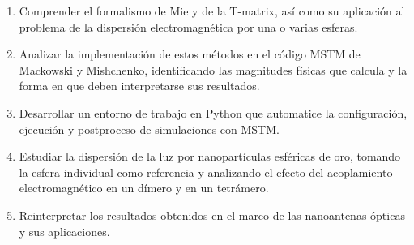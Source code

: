 \begin{enumerate}
\item Comprender el formalismo de Mie y de la T-matrix, así como su aplicación
        al problema de la dispersión electromagnética por una o varias esferas.

\item Analizar la implementación de estos métodos en el código MSTM de
        Mackowski y Mishchenko, identificando las magnitudes físicas que calcula y la forma
        en que deben interpretarse sus resultados.

\item Desarrollar un entorno de trabajo en Python que automatice la
        configuración, ejecución y postproceso de simulaciones con MSTM.

\item Estudiar la dispersión de la luz por nanopartículas esféricas de oro,
        tomando la esfera individual como referencia y analizando el efecto del
        acoplamiento electromagnético en un dímero y en un tetrámero.

\item Reinterpretar los resultados obtenidos en el marco de las nanoantenas
        ópticas y sus aplicaciones.
\end{enumerate}
